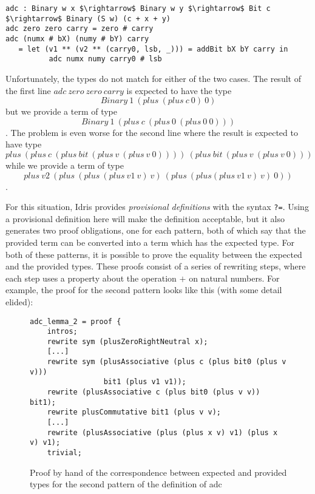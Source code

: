 \begin{lstlisting}
adc : Binary w x $\rightarrow$ Binary w y $\rightarrow$ Bit c $\rightarrow$ Binary (S w) (c + x + y)
adc zero zero carry = zero # carry
adc (numx # bX) (numy # bY) carry
   = let (v1 ** (v2 ** (carry0, lsb, _))) = addBit bX bY carry in
          adc numx numy carry0 # lsb
\end{lstlisting}

Unfortunately, the types do not match for either of the two cases. 
The result of the first line $adc\ zero\ zero\ carry$ is
expected to have the type\[Binary\ 1\ (plus\ (plus\ c\ 0)\ 0)\] but we
provide a term of type \[Binary\ 1\ (plus\ c\ (plus\ 0\ (plus\ 0\ 0)))\]. The
problem is even worse for the second line where the result is expected to have
type \[plus\ (plus\ c\ (plus\ bit\ (plus\ v\ (plus\ v\ 0))))\ (plus\ bit\
(plus\ v\ (plus\ v\ 0)))\] while we provide a term of type \[plus\
v2\ (plus\ (plus\ (plus\ v1\ v)\ v)\ (plus\ (plus (plus\ v1\ v)\ v)\ 0))\].

For
this situation, Idris provides \emph{provisional definitions} with the 
syntax \texttt{?=}. Using a provisional definition here will make
the definition acceptable, but it also generates two proof obligations, one
for each pattern, both of which say that the provided term can be
converted into a term which has the expected type.  For both of these
patterns, it is possible to prove the equality between the expected and
the provided types. These proofs
consist of a series of rewriting steps, where each step uses a property about the
operation $+$ on natural numbers.  For example, the proof for the second
pattern looks like this (with some detail elided):

\begin{figure}[H]
\figrule
\begin{center}
\begin{lstlisting}
adc_lemma_2 = proof {
    intros;
    rewrite sym (plusZeroRightNeutral x);
    [...]
    rewrite sym (plusAssociative (plus c (plus bit0 (plus v v))) 
                 bit1 (plus v1 v1));
    rewrite (plusAssociative c (plus bit0 (plus v v)) bit1);
    rewrite plusCommutative bit1 (plus v v);
    [...]
    rewrite (plusAssociative (plus (plus x v) v1) (plus x v) v1);
    trivial;
\end{lstlisting}
\end{center}
\caption{Proof by hand of the correspondence between expected and provided types for the second pattern of the definition of adc}
\figrule
\end{figure}


